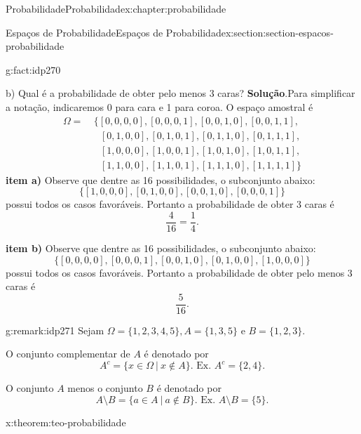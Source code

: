 \documentclass[oneside,10pt,]{book}
\newcommand{\blocktitlefont}{\relax}
\newcommand{\terminology}[1]{\textbf{#1}}
\numberwithin{equation}{section}
\newcommand{\amp}{&}
\begin{document}
\begin{chapterptx}{Probabilidade}{}{Probabilidade}{}{}{x:chapter:probabilidade}
\begin{sectionptx}{Espaços de Probabilidade}{}{Espaços de Probabilidade}{}{}{x:section:section-espacos-probabilidade}
\begin{fact}{}{}{g:fact:idp270}
\par
b) Qual é a probabilidade de obter pelo menos 3 caras?%
\textbf{\blocktitlefont Solução}.\quad{}Para simplificar a notação, indicaremos 0 para cara e 1 para coroa. O espaço amostral é%
\begin{align*}
\Omega = \amp ~\{ [0, 0, 0, 0],[0, 0, 0, 1],[0, 0, 1, 0],[0, 0, 1, 1], \\
\amp ~~~~[0, 1, 0, 0],[0, 1, 0, 1],[0, 1, 1, 0],[0, 1, 1, 1], \\
\amp ~~~~[1, 0, 0, 0],[1, 0, 0, 1],[1, 0, 1, 0],[1, 0, 1, 1],  \\
\amp ~~~~[1, 1, 0, 0],[1, 1, 0, 1],[1, 1, 1, 0],[1, 1, 1, 1]\}  
\end{align*}
\terminology{item a)} Observe que dentre as 16 possibilidades, o subconjunto abaixo:%
\begin{equation*}
\{  [1, 0, 0, 0], [0, 1, 0, 0], [0, 0, 1, 0], [0, 0, 0, 1] \} 
\end{equation*}
possui todos os casos favoráveis. Portanto a probabilidade de obter 3 caras é%
\begin{equation*}
\frac{4}{16} = \frac{1}{4}. 
\end{equation*}
%
\par
\terminology{item b)} Observe que dentre as 16 possibilidades, o subconjunto abaixo:%
\begin{equation*}
\{ [0, 0, 0, 0], [0, 0, 0, 1], [0, 0, 1, 0], [0, 1, 0, 0], [1, 0, 0, 0] \} 
\end{equation*}
possui todos os casos favoráveis. Portanto a probabilidade de obter pelo menos 3 caras é%
\begin{equation*}
\frac{5}{16}. 
\end{equation*}
%
\end{fact}
\begin{remark}{}{g:remark:idp271}%
Sejam \(\Omega = \{1, 2, 3, 4, 5 \}, A = \{1, 3, 5\}\) e \(B = \{1, 2, 3\}\).%
\par
O conjunto complementar de \(A\) é denotado por%
\begin{equation*}
A^c = \{x\in\Omega~|~ x\notin A\}. \text{ Ex. }  A^c = \{2, 4\}.
\end{equation*}
%
\par
O conjunto \(A\) menos o conjunto \(B\) é denotado por%
\begin{equation*}
A\setminus B = \{a\in A ~|~ a\notin B\}. \text{ Ex. } A\setminus B = \{5\}.
\end{equation*}
%
\end{remark}
\begin{theorem}{}{}{x:theorem:teo-probabilidade}%

\end{theorem}
\end{sectionptx}
\end{chapterptx}
\end{document}
